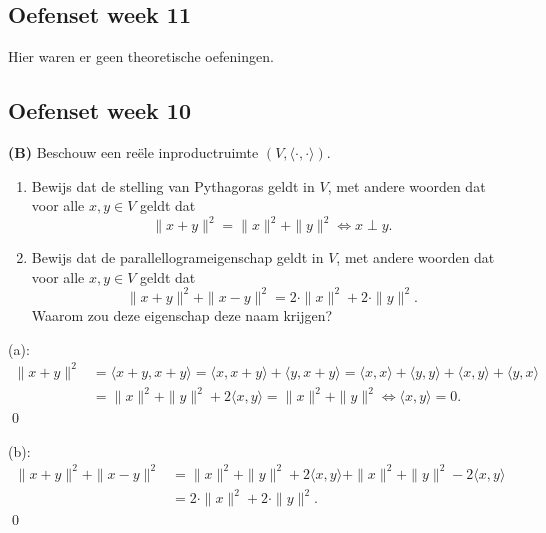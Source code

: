 \subsection{Oefenset week 11}
Hier waren er geen theoretische oefeningen.
\subsection{Oefenset week 10}

\begin{oefening}[8.2.5] \textbf{(B)}
    Beschouw een reële inproductruimte $(V, \langle \cdot, \cdot \rangle)$.
    \begin{enumerate}
        \item[(a)] Bewijs dat de stelling van Pythagoras geldt in $V$, met andere woorden dat voor alle $x, y \in V$ geldt dat
        \[ \|x + y\|^2 = \|x\|^2 + \|y\|^2 \iff x \perp y. \]
        \item[(b)] Bewijs dat de parallellogrameigenschap geldt in $V$, met andere woorden dat voor alle $x, y \in V$ geldt dat
        \[ \|x + y\|^2 + \|x - y\|^2 = 2 \cdot \|x\|^2 + 2 \cdot \|y\|^2. \]
        Waarom zou deze eigenschap deze naam krijgen?
    \end{enumerate}

    (a):
    \begin{align*}
    \|x + y\|^2 
    &= \langle x+y,x+y \rangle 
    = \langle x,x+y \rangle + \langle y,x+y \rangle 
    = \langle x,x \rangle + \langle y,y \rangle + \langle x,y \rangle + \langle y,x \rangle\\
    &= \|x\|^2 + \|y\|^2 + 2 \langle x,y \rangle
    = \|x\|^2 + \|y\|^2 \iff \langle x,y \rangle = 0.
    \end{align*}\qed

    (b):
    \begin{align*}
        \|x + y\|^2 + \|x - y\|^2 
        &= \|x\|^2 + \|y\|^2 + 2 \langle x,y \rangle + \|x\|^2 + \|y\|^2 - 2 \langle x,y \rangle \\
        &= 2 \cdot \|x\|^2 + 2 \cdot \|y\|^2.
    \end{align*}\qed
\end{oefening}

